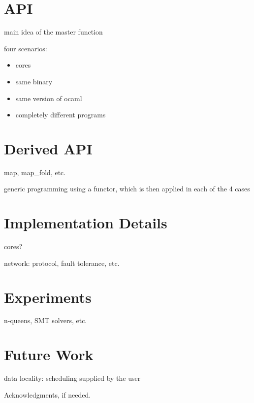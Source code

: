 \documentclass[preprint]{sigplanconf}
\begin{document}
\section{API}

main idea of the master function

four scenarios:
\begin{itemize}
\item cores
\item same binary
\item same version of ocaml
\item completely different programs
\end{itemize}

\section{Derived API}

map, map\_fold, etc.

generic programming using a functor, which is then applied in each of
the 4 cases

\section{Implementation Details}

cores?

network: protocol, fault tolerance, etc.

\section{Experiments}

n-queens, SMT solvers, etc.

\section{Future Work}

data locality: scheduling supplied by the user



\acks

Acknowledgments, if needed.


\nocite{*}


\end{document}
